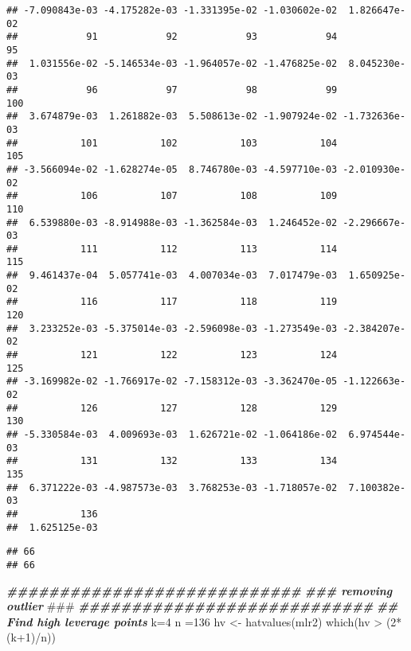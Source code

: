 \documentclass[
]{article}
\newenvironment{Shaded}{\begin{snugshade}}{\end{snugshade}}
\newcommand{\AlertTok}[1]{\textcolor[rgb]{0.94,0.16,0.16}{#1}}
\newcommand{\DecValTok}[1]{\textcolor[rgb]{0.00,0.00,0.81}{#1}}
\newcommand{\DocumentationTok}[1]{\textcolor[rgb]{0.56,0.35,0.01}{\textbf{\textit{#1}}}}
\newcommand{\FunctionTok}[1]{\textcolor[rgb]{0.00,0.00,0.00}{#1}}
\newcommand{\NormalTok}[1]{#1}
\newcommand{\OtherTok}[1]{\textcolor[rgb]{0.56,0.35,0.01}{#1}}
\newcommand{\SpecialCharTok}[1]{\textcolor[rgb]{0.00,0.00,0.00}{#1}}
\begin{document}
\begin{verbatim}
## -7.090843e-03 -4.175282e-03 -1.331395e-02 -1.030602e-02  1.826647e-02 
##            91            92            93            94            95 
##  1.031556e-02 -5.146534e-03 -1.964057e-02 -1.476825e-02  8.045230e-03 
##            96            97            98            99           100 
##  3.674879e-03  1.261882e-03  5.508613e-02 -1.907924e-02 -1.732636e-03 
##           101           102           103           104           105 
## -3.566094e-02 -1.628274e-05  8.746780e-03 -4.597710e-03 -2.010930e-02 
##           106           107           108           109           110 
##  6.539880e-03 -8.914988e-03 -1.362584e-03  1.246452e-02 -2.296667e-03 
##           111           112           113           114           115 
##  9.461437e-04  5.057741e-03  4.007034e-03  7.017479e-03  1.650925e-02 
##           116           117           118           119           120 
##  3.233252e-03 -5.375014e-03 -2.596098e-03 -1.273549e-03 -2.384207e-02 
##           121           122           123           124           125 
## -3.169982e-02 -1.766917e-02 -7.158312e-03 -3.362470e-05 -1.122663e-02 
##           126           127           128           129           130 
## -5.330584e-03  4.009693e-03  1.626721e-02 -1.064186e-02  6.974544e-03 
##           131           132           133           134           135 
##  6.371222e-03 -4.987573e-03  3.768253e-03 -1.718057e-02  7.100382e-03 
##           136 
##  1.625125e-03
\end{verbatim}

\begin{Shaded}
\end{Shaded}

\begin{verbatim}
## 66 
## 66
\end{verbatim}

\begin{Shaded}
\begin{Highlighting}[]
\DocumentationTok{\#\#\#\#\#\#\#\#\#\#\#\#\#\#\#\#\#\#\#\#\#\#\#\#\#\#\#\#}
\DocumentationTok{\#\#\# removing outlier }\AlertTok{\#\#\#}
\DocumentationTok{\#\#\#\#\#\#\#\#\#\#\#\#\#\#\#\#\#\#\#\#\#\#\#\#\#\#\#\#}
\DocumentationTok{\#\# Find high leverage points}
\NormalTok{k}\OtherTok{=}\DecValTok{4}
\NormalTok{n }\OtherTok{=}\DecValTok{136}
\NormalTok{hv }\OtherTok{\textless{}{-}} \FunctionTok{hatvalues}\NormalTok{(mlr2)}
\FunctionTok{which}\NormalTok{(hv }\SpecialCharTok{\textgreater{}}\NormalTok{ (}\DecValTok{2}\SpecialCharTok{*}\NormalTok{(k}\SpecialCharTok{+}\DecValTok{1}\NormalTok{)}\SpecialCharTok{/}\NormalTok{n))}
\end{Highlighting}
\end{Shaded}
\end{document}
